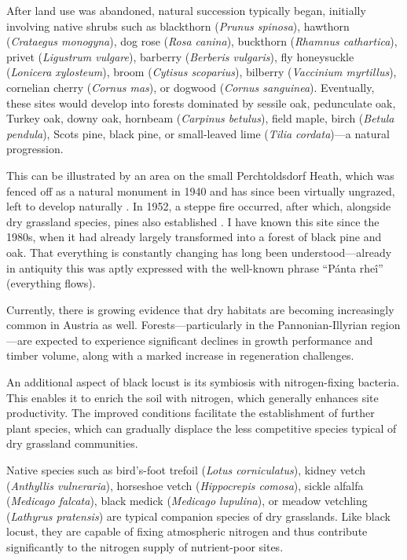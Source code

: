 After land use was abandoned, natural succession typically began, initially involving native shrubs such as blackthorn (\emph{Prunus spinosa}), hawthorn (\emph{Crataegus monogyna}), dog rose (\emph{Rosa canina}), buckthorn (\emph{Rhamnus cathartica}), privet (\emph{Ligustrum vulgare}), barberry (\emph{Berberis vulgaris}), fly honeysuckle (\emph{Lonicera xylosteum}), broom (\emph{Cytisus scoparius}), bilberry (\emph{Vaccinium myrtillus}), cornelian cherry (\emph{Cornus mas}), or dogwood (\emph{Cornus sanguinea}). Eventually, these sites would develop into forests dominated by sessile oak, pedunculate oak, Turkey oak, downy oak, hornbeam (\emph{Carpinus betulus}), field maple, birch (\emph{Betula pendula}), Scots pine, black pine, or small-leaved lime (\emph{Tilia cordata})—a natural progression.

This can be illustrated by an area on the small Perchtoldsdorf Heath, which was fenced off as a natural monument in 1940 and has since been virtually ungrazed, left to develop naturally \citep{rosenkranz1953heide}. In 1952, a steppe fire occurred, after which, alongside dry grassland species, pines also established \citep{rosenkranz1953heideBrand}. I have known this site since the 1980s, when it had already largely transformed into a forest of black pine and oak. That everything is constantly changing has long been understood—already in antiquity this was aptly expressed with the well-known phrase \enquote{Pánta rheî} (everything flows). 

Currently, there is growing evidence that dry habitats are becoming increasingly common in Austria as well. Forests—particularly in the Pannonian-Illyrian region—are expected to experience significant declines in growth performance and timber volume, along with a marked increase in regeneration challenges.


An additional aspect of black locust is its symbiosis with nitrogen-fixing bacteria. This enables it to enrich the soil with nitrogen, which generally enhances site productivity. The improved conditions facilitate the establishment of further plant species, which can gradually displace the less competitive species typical of dry grassland communities.

Native species such as bird's-foot trefoil (\emph{Lotus corniculatus}), kidney vetch (\emph{Anthyllis vulneraria}), horseshoe vetch (\emph{Hippocrepis comosa}), sickle alfalfa (\emph{Medicago falcata}), black medick (\emph{Medicago lupulina}), or meadow vetchling (\emph{Lathyrus pratensis}) are typical companion species of dry grasslands. Like black locust, they are capable of fixing atmospheric nitrogen and thus contribute significantly to the nitrogen supply of nutrient-poor sites.


